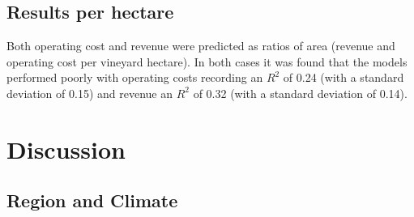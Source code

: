 \documentclass[review,12pt,authoryear]{elsarticle}
\begin{document}
\begin{linenumbers}
\subsection{Results per hectare}
Both operating cost and revenue were predicted as ratios of area (revenue and operating cost per vineyard hectare). In both cases it was found that the models performed poorly with operating costs recording an $R^2$ of 0.24 (with a standard deviation of 0.15) and revenue an $R^2$ of 0.32 (with a standard deviation of 0.14).

\section{Discussion}

\subsection{Region and Climate}


\end{linenumbers}
\end{document}
